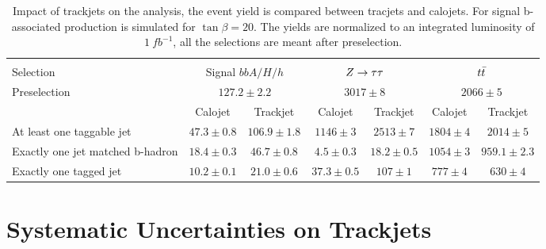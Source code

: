 \begin{table}[tp]
	\begin{footnotesize}
	\begin{tabular}{p{3.0cm} |c c| c c| c c }
	\hline
	\hline\\ 
Selection 	& 	\multicolumn{2}{|c|}{Signal $bbA/H/h$ }	&\multicolumn{2}{c|}{$Z\rightarrow \tau\tau$}	& \multicolumn{2}{c}{$t\bar{t}$}	\\
	[0.5cm]
	\hline
Preselection		&	\multicolumn{2}{|c|}{$127.2 \pm 2.2$} &\multicolumn{2}{c|}{$3017 \pm 8$} &\multicolumn{2}{c}{$2066 \pm 5$} \\[0.5cm]
			&	Calojet		&	Trackjet &Calojet	&Trackjet	&Calojet	&Trackjet \\[0.5cm]
At least one taggable jet& $47.3 \pm0.8$	&$106.9 \pm1.8$	 &$1146 \pm3 $	&$2513 \pm 7$	&$1804 \pm 4$	&$2014 \pm 5$ \\[1cm]
Exactly one jet matched b-hadron& $18.4 \pm 0.3$ & $46.7 \pm 0.8$ & $4.5 \pm 0.3$	&$18.2 \pm 0.5$ 	&$1054 \pm 3$	&$959.1 \pm 2.3$  \\[1cm]
Exactly one tagged jet&	$10.2 \pm0.1$	&$21.0 \pm 0.6$	& $37.3 \pm 0.5$ &$107 \pm 1$ &$777 \pm 4$	&$630 \pm4$ \\[1cm]
	\hline
	\hline
	
	\end{tabular}
	\end{footnotesize}
	\caption{Impact of trackjets on the analysis, the event yield is compared between tracjets and calojets.
		For signal b-associated production is simulated for $\tan\beta=20$. The yields
		are normalized to an integrated luminosity of $1 ~ fb^{-1}$, all the selections are meant after preselection.}
	\label{tab:tj_cj}
\end{table}

\section{Systematic Uncertainties on Trackjets}\label{sec:trackjetsys}
